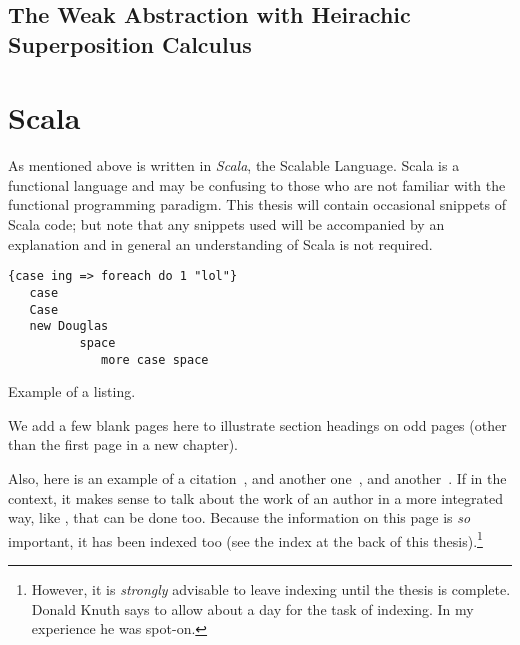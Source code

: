 \subsection{The Weak Abstraction with Heirachic Superposition Calculus}

\section{Scala}
\label{sec:scala}

As mentioned above \beagle is written in \emph{Scala}, the Scalable Language. Scala
is a functional language and may be confusing to those who are not familiar with the
functional programming paradigm. This thesis will contain occasional snippets of
Scala code; but note that any snippets used will be accompanied by an explanation
and in general an understanding of Scala is not required.

\begin{listing}[H]
\begin{verbatim}
{case ing => foreach do 1 "lol"}
   case
   Case
   new Douglas
          space
             more case space
\end{verbatim}
\caption{Example of a listing.}
\label{lst:example}
\end{listing}




We add a few blank pages here to illustrate section
headings on odd
pages (other than the first page in a new chapter).

Also, here is an example of a citation~\cite{lamport94}, and another
one~\cite{knuth86}, and another~\cite{goossens94}.  If in the context,
it makes sense to talk about the work of an author in a more
integrated way, like , that can be done
too.  Because the information on this page
is \emph{so} important, it has been indexed too (see the index at the
back of this thesis).\footnote{However, it is \emph{strongly}
  advisable to leave indexing until the thesis is complete.  Donald
  Knuth says to allow about a day for the task of indexing.  In my
  experience he was spot-on.}

